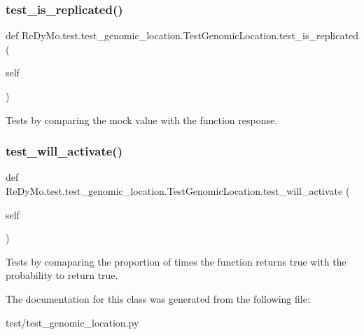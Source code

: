 \subsubsection{\texorpdfstring{test\+\_\+is\+\_\+replicated()}{test\_is\_replicated()}}
{\footnotesize\ttfamily def Re\+Dy\+Mo.\+test.\+test\+\_\+genomic\+\_\+location.\+Test\+Genomic\+Location.\+test\+\_\+is\+\_\+replicated (\begin{DoxyParamCaption}\item[{}]{self }\end{DoxyParamCaption})}



Tests by comparing the mock value with the function response. 

\mbox{\label{classReDyMo_1_1test_1_1test__genomic__location_1_1TestGenomicLocation_a165c828a38385ae5180c0984203207f9}} 
\subsubsection{\texorpdfstring{test\+\_\+will\+\_\+activate()}{test\_will\_activate()}}
{\footnotesize\ttfamily def Re\+Dy\+Mo.\+test.\+test\+\_\+genomic\+\_\+location.\+Test\+Genomic\+Location.\+test\+\_\+will\+\_\+activate (\begin{DoxyParamCaption}\item[{}]{self }\end{DoxyParamCaption})}



Tests by comaparing the proportion of times the function returns true with the probability to return true. 



The documentation for this class was generated from the following file\+:\begin{DoxyCompactItemize}
\item 
test/test\+\_\+genomic\+\_\+location.\+py\end{DoxyCompactItemize}
